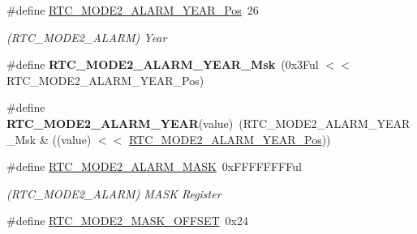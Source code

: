 \begin{DoxyCompactItemize}
\item 
\hypertarget{group___s_a_m_l21___r_t_c_gadedc78e12f663fadb68e11036218834f}{}\#define \hyperlink{group___s_a_m_l21___r_t_c_gadedc78e12f663fadb68e11036218834f}{R\+T\+C\+\_\+\+M\+O\+D\+E2\+\_\+\+A\+L\+A\+R\+M\+\_\+\+Y\+E\+A\+R\+\_\+\+Pos}~26\label{group___s_a_m_l21___r_t_c_gadedc78e12f663fadb68e11036218834f}

\begin{DoxyCompactList}\small\item\em (R\+T\+C\+\_\+\+M\+O\+D\+E2\+\_\+\+A\+L\+A\+R\+M) Year \end{DoxyCompactList}\item 
\hypertarget{group___s_a_m_l21___r_t_c_ga7e0298a1cb9e26b7c10c43ec3923b1cd}{}\#define {\bfseries R\+T\+C\+\_\+\+M\+O\+D\+E2\+\_\+\+A\+L\+A\+R\+M\+\_\+\+Y\+E\+A\+R\+\_\+\+Msk}~(0x3\+Ful $<$$<$ R\+T\+C\+\_\+\+M\+O\+D\+E2\+\_\+\+A\+L\+A\+R\+M\+\_\+\+Y\+E\+A\+R\+\_\+\+Pos)\label{group___s_a_m_l21___r_t_c_ga7e0298a1cb9e26b7c10c43ec3923b1cd}

\item 
\hypertarget{group___s_a_m_l21___r_t_c_ga6bafc411c66f03af4c73477a66bd647d}{}\#define {\bfseries R\+T\+C\+\_\+\+M\+O\+D\+E2\+\_\+\+A\+L\+A\+R\+M\+\_\+\+Y\+E\+A\+R}(value)~(R\+T\+C\+\_\+\+M\+O\+D\+E2\+\_\+\+A\+L\+A\+R\+M\+\_\+\+Y\+E\+A\+R\+\_\+\+Msk \& ((value) $<$$<$ \hyperlink{group___s_a_m_l21___r_t_c_gadedc78e12f663fadb68e11036218834f}{R\+T\+C\+\_\+\+M\+O\+D\+E2\+\_\+\+A\+L\+A\+R\+M\+\_\+\+Y\+E\+A\+R\+\_\+\+Pos}))\label{group___s_a_m_l21___r_t_c_ga6bafc411c66f03af4c73477a66bd647d}

\item 
\hypertarget{group___s_a_m_l21___r_t_c_ga5da2181f9f17b36299bd0068301bc653}{}\#define \hyperlink{group___s_a_m_l21___r_t_c_ga5da2181f9f17b36299bd0068301bc653}{R\+T\+C\+\_\+\+M\+O\+D\+E2\+\_\+\+A\+L\+A\+R\+M\+\_\+\+M\+A\+S\+K}~0x\+F\+F\+F\+F\+F\+F\+F\+Ful\label{group___s_a_m_l21___r_t_c_ga5da2181f9f17b36299bd0068301bc653}

\begin{DoxyCompactList}\small\item\em (R\+T\+C\+\_\+\+M\+O\+D\+E2\+\_\+\+A\+L\+A\+R\+M) M\+A\+S\+K Register \end{DoxyCompactList}\item 
\hypertarget{group___s_a_m_l21___r_t_c_gacee3fc9d6ffe942456cd9f590ab0f4d8}{}\#define \hyperlink{group___s_a_m_l21___r_t_c_gacee3fc9d6ffe942456cd9f590ab0f4d8}{R\+T\+C\+\_\+\+M\+O\+D\+E2\+\_\+\+M\+A\+S\+K\+\_\+\+O\+F\+F\+S\+E\+T}~0x24\label{group___s_a_m_l21___r_t_c_gacee3fc9d6ffe942456cd9f590ab0f4d8}


\end{DoxyCompactItemize}
